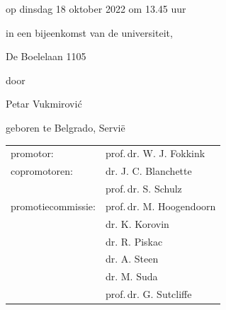 \begin{titlepage}
\begin{center}
op dinsdag 18 oktober 2022 om 13.45 uur

in een bijeenkomst van de universiteit,

De Boelelaan 1105

\bigskip
\bigskip

door

\smallskip

Petar Vukmirovi\'c

\smallskip

geboren te Belgrado, Servi\"e

\vspace*{2\bigskipamount}

\end{center}

\clearpage
\thispagestyle{empty}


\medskip\noindent
\begin{tabular}{ll}
    promotor: & prof.$\,$dr. W. J. Fokkink \\[4\jot]
    copromotoren: & dr. J. C. Blanchette \\
                  & prof.$\,$dr. S. Schulz \\[4\jot]
    promotiecommissie: & prof.$\,$dr. M. Hoogendoorn  \\
                      & dr. K. Korovin               \\
                      & dr. R. Piskac                \\
                      & dr. A. Steen                 \\
                      & dr. M. Suda                  \\
                      & prof.$\,$dr. G. Sutcliffe    \\
    
\end{tabular}





\end{titlepage}
